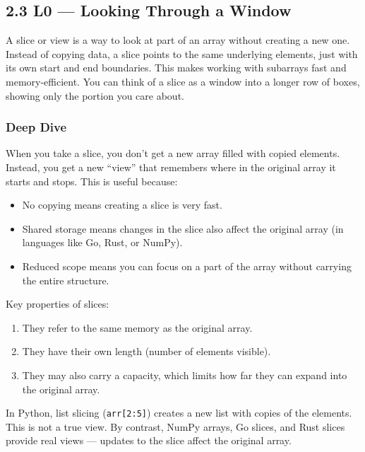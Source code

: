 \documentclass[
  letterpaper,
  DIV=11,
  numbers=noendperiod]{scrreprt}
\providecommand{\tightlist}{%
  \setlength{\itemsep}{0pt}\setlength{\parskip}{0pt}}
\begin{document}
\subsection{2.3 L0 --- Looking Through a
Window}\label{l0-looking-through-a-window}

A slice or view is a way to look at part of an array without creating a
new one. Instead of copying data, a slice points to the same underlying
elements, just with its own start and end boundaries. This makes working
with subarrays fast and memory-efficient. You can think of a slice as a
window into a longer row of boxes, showing only the portion you care
about.

\subsubsection{Deep Dive}\label{deep-dive-9}

When you take a slice, you don't get a new array filled with copied
elements. Instead, you get a new ``view'' that remembers where in the
original array it starts and stops. This is useful because:

\begin{itemize}
\tightlist
\item
  No copying means creating a slice is very fast.
\item
  Shared storage means changes in the slice also affect the original
  array (in languages like Go, Rust, or NumPy).
\item
  Reduced scope means you can focus on a part of the array without
  carrying the entire structure.
\end{itemize}

Key properties of slices:

\begin{enumerate}
\def\labelenumi{\arabic{enumi}.}
\tightlist
\item
  They refer to the same memory as the original array.
\item
  They have their own length (number of elements visible).
\item
  They may also carry a capacity, which limits how far they can expand
  into the original array.
\end{enumerate}

In Python, list slicing (\texttt{arr{[}2:5{]}}) creates a new list with
copies of the elements. This is not a true view. By contrast, NumPy
arrays, Go slices, and Rust slices provide real views --- updates to the
slice affect the original array.
\end{document}
